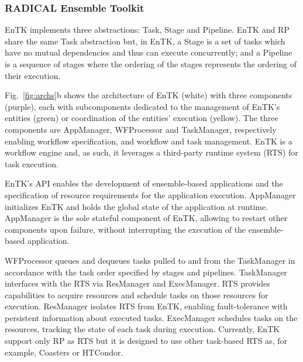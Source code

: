 \documentclass[preprint,12pt, a4paper]{elsarticle}
\begin{document}
\subsubsection{RADICAL Ensemble Toolkit}\label{sssec:arch_entk}

EnTK implements three abstractions: Task, Stage and Pipeline. EnTK and RP share
the same Task abstraction but, in EnTK, a Stage is a set of tasks which have no
mutual dependencies and thus can execute concurrently; and a Pipeline is a
sequence of stages where the ordering of the stages represents the ordering of
their execution.


Fig.~\ref{fig:archs}b shows the architecture of EnTK (white) with three
components (purple), each with subcomponents dedicated to the management of
EnTK's entities (green) or coordination of the entities' execution (yellow). The
three components are AppManager, WFProcessor and TaskManager, respectively
enabling workflow specification, and workflow and task management. EnTK is a
workflow engine and, as such, it leverages a third-party runtime system (RTS)
for task execution.


EnTK's API enables the development of ensemble-based applications
and the specification of resource requirements for the application execution.
AppManager initializes EnTK and holds the global state of the application at
runtime. AppManager is the sole stateful component of EnTK, allowing to restart
other components upon failure, without interrupting the execution of the
ensemble-based application.

WFProcessor queues and dequeues tasks pulled to and from the TaskManager in
accordance with the task order specified by stages and pipelines. TaskManager
interfaces with the RTS via ResManager and ExecManager. RTS provides
capabilities to acquire resources and schedule tasks on those resources for
execution. ResManager isolates RTS from EnTK, enabling fault-tolerance with
persistent information about executed tasks. ExecManager schedules tasks on
the resources, tracking the state of each task during execution. Currently,
EnTK support only RP as RTS but it is designed to use other task-based RTS
as, for example, Coasters or HTCondor.
\end{document}
